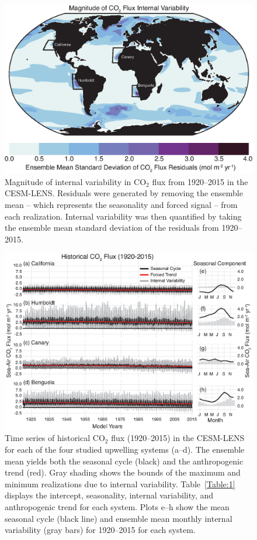 \documentclass[hvmath, online,bgd]{copernicus_discussions}
\begin{document}
\clearpage
\begin{figure}[t]{}
	\includegraphics[width=12cm]{figures/figure2.eps}
	\caption{Magnitude of internal variability in CO$_{2}$ flux from 1920--2015 in the CESM-LENS. Residuals were generated by removing the ensemble mean -- which represents the seasonality and forced signal -- from each realization. Internal variability was then quantified by taking the ensemble mean standard deviation of the residuals from 1920--2015.}
	\label{Fig:Internal}
\end{figure}

\clearpage
\begin{figure}[t]
	\includegraphics[width=12cm]{figures/figure3_with_seasonal_and_internal.eps}
	\caption{Time series of historical CO$_{2}$ flux (1920--2015) in the CESM-LENS for each of the four studied upwelling systems (a--d). The ensemble mean yields both the seasonal cycle (black) and the anthropogenic trend (red). Gray shading shows the bounds of the maximum and minimum realizations due to internal variability. Table~\ref{Table:1} displays the intercept, seasonality, internal variability, and anthropogenic trend for each system. Plots e--h show the mean seasonal cycle (black line) and ensemble mean monthly internal variability (gray bars) for 1920--2015 for each system.}
	\label{Fig:TimeSeries}
\end{figure}
\end{document}
